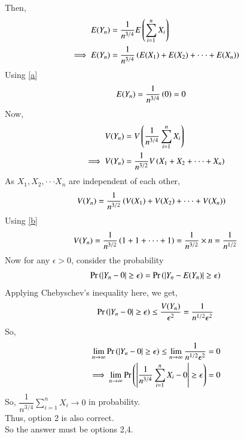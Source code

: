 \documentclass[journal,12pt,twocolumn]{IEEEtran}
\begin{document}
Then,
\begin{align}
    E(Y_n) &= \dfrac{1}{n^{3/4}}E\left(\sum_{i=1}^nX_i\right) \\
    \implies E(Y_n) &= \dfrac{1}{n^{3/4}}\left(E(X_1)+E(X_2)+ \cdot \cdot \cdot +E(X_n)\right)
\end{align}
Using \eqref{a}
\begin{align} \label{e}
    E(Y_n) &= \dfrac{1}{n^{3/4}}\left(0\right) =0
\end{align}
Now,
\begin{align}
    V(Y_n) &= V\left(\dfrac{1}{n^{3/4}}\sum_{i=1}^nX_i\right) \\
    \implies V(Y_n) &= \dfrac{1}{n^{3/2}}V\left(X_1+X_2+ \cdot \cdot \cdot +X_n\right)
\end{align}
As $X_1, X_2, \cdot \cdot \cdot X_n$ are independent of each other,
\begin{align}
    V(Y_n) &= \dfrac{1}{n^{3/2}}\left(V(X_1)+V(X_2)+ \cdot \cdot \cdot +V(X_n)\right)
\end{align}
Using \eqref{b}
\begin{align}
    V(Y_n)=\dfrac{1}{n^{3/2}}\left(1+1+\cdot \cdot \cdot+1\right)=\dfrac{1}{n^{3/2}}\times n=\dfrac{1}{n^{1/2}}
\end{align}
Now for any $\epsilon>0$, consider the probability
\begin{align}
    \Pr\left(|Y_n-0|\geq \epsilon\right)=\Pr\left(|Y_n-E(Y_n)|\geq \epsilon\right)
\end{align}
Applying Chebyschev's inequality here, we get,
\begin{align}
    \Pr\left(|Y_n-0|\geq \epsilon\right) \leq \dfrac{V(Y_n)}{\epsilon^2} = \dfrac{1}{n^{1/2}\epsilon^2}
\end{align}
So,
\begin{align}
    \lim_{n \to \infty}\Pr\left(|Y_n-0|\geq \epsilon\right) \leq \lim_{n \to \infty }\dfrac{1}{n^{1/2}\epsilon^2}=0\\
    \implies \lim_{n \to \infty}\Pr\left(\left | \dfrac{1}{n^{3/4}}\sum_{i=1}^nX_i - 0 \right|\geq \epsilon\right)=0
\end{align}
So, $\dfrac{1}{n^{3/4}}\sum_{i=1}^nX_i \to 0$ in probability.\\
Thus, option 2 is also correct.\\
So the answer must be options 2,4.
\end{document}
